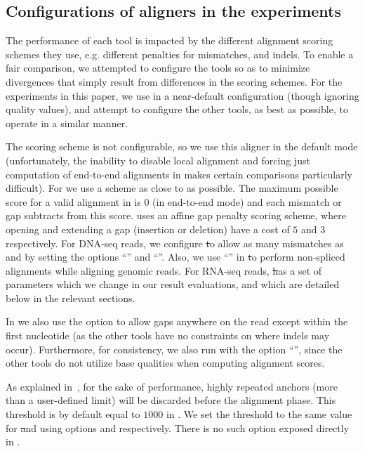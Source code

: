 \subsection{Configurations of aligners in the experiments}

The performance of each tool is impacted by the different alignment scoring schemes they use, e.g. 
different penalties for mismatches, and indels. To enable a fair comparison, we attempted to configure 
the tools so as to minimize divergences that simply result from differences in the scoring schemes. For 
the experiments in this paper, we use \bt in a near-default configuration (though ignoring quality values), 
and attempt to configure the other tools, as best as possible, to operate in a similar manner.

The \debga scoring scheme is not configurable, so we use this aligner in the default mode (unfortunately, 
the inability to disable local alignment and forcing just computation of end-to-end alignments in \debga makes 
certain comparisons particularly difficult). For \puffaligner we use a scheme as close to \bt as possible. The 
maximum possible score for a valid alignment in \bt is $0$ (in end-to-end mode) and each mismatch or gap subtracts 
from this score. \bt uses an affine gap penalty scoring scheme, where opening and extending a gap (insertion or 
deletion) have a cost of $5$ and $3$ respectively. For DNA-seq reads, we configure \st to allow as many mismatches 
as \bt and \puffaligner by setting the options ``'' and 
``''. Also, we use ``'' in \st to perform 
non-spliced alignments while aligning genomic reads. For RNA-seq reads, \st has a set of parameters which 
we change in our result evaluations, and which are detailed below in the relevant sections.

In \bt we also use the option  to allow gaps anywhere on the read except within the first 
nucleotide (as the other tools have no constraints on where indels may occur). Furthermore, for consistency, 
we also run \bt with the option ``'', since the other tools do not utilize base qualities 
when computing alignment scores.

As explained in~, for the sake of performance, highly repeated anchors 
(more than a user-defined limit) will be discarded before the alignment phase.
This threshold is by default equal to $1000$ in \puffaligner. We set the threshold to the same 
value for \st and \debga using options  and  
respectively. There is no such option exposed directly in \bt.

